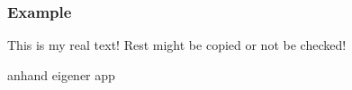 \subsubsection{Example}\label{subsection:license-google-example}
This is my real text! Rest might be copied or not be checked!

anhand eigener app
